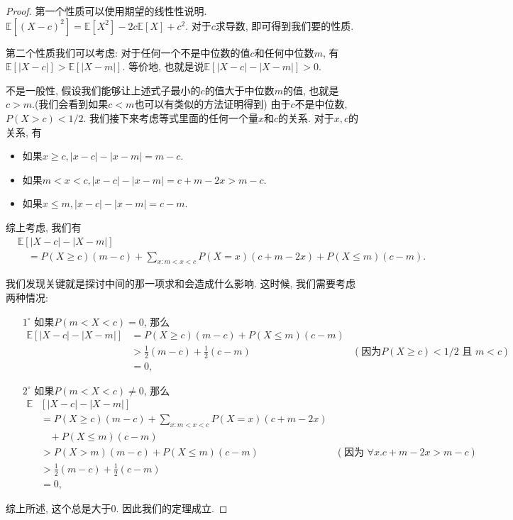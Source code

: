 \begin{proof}
    第一个性质可以使用期望的线性性说明. $\mathbb{E}\left[(X-c)^2\right]=\mathbb{E}\left[X^2\right]-2 c \mathbb{E}[X]+c^2$. 对于$c$求导数, 即可得到我们要的性质. 

    第二个性质我们可以考虑: 对于任何一个不是中位数的值$c$和任何中位数$m$, 有$\mathbb{E}[|X-c|]>\mathbb{E}[|X-m|]$. 等价地, 也就是说$\mathbb{E}[|X-c|-|X-m|]>0$. 

    不是一般性, 假设我们能够让上述式子最小的$c$的值大于中位数$m$的值, 也就是$c>m$.(我们会看到如果$c<m$也可以有类似的方法证明得到) 由于$c$不是中位数, $P(X>c)<1/2$. 我们接下来考虑等式里面的任何一个量$x$和$c$的关系. 对于$x,c$的关系, 有
    \begin{itemize}
        \item 如果$x \geq c,|x-c|-|x-m|=m-c$.
        \item 如果$m<x<c,|x-c|-|x-m|=c+m-2x>m-c$.
        \item 如果$x \leq m,|x-c|-|x-m|=c-m$.
    \end{itemize}

    综上考虑, 我们有
    $$\begin{aligned} & \mathbb{E}[|X-c|-|X-m|] \\ & \quad=P(X \geq c)(m-c)+\sum_{x: m<x<c} P(X=x)(c+m-2 x)+P(X \leq m)(c-m) .\end{aligned}$$

    我们发现关键就是探讨中间的那一项求和会造成什么影响. 这时候, 我们需要考虑两种情况:
    \begin{itemize}
        \item [$1^\circ$] 如果$P(m<X<c)=0$, 那么$$
        \begin{aligned}
        \mathbb{E}[|X-c|-|X-m|] & =P(X \geq c)(m-c)+P(X \leq m)(c-m) \\
        & >\frac{1}{2}(m-c)+\frac{1}{2}(c-m) &(\text{因为}P(X \geq c)<1 / 2 \text { 且 } m<c)\\
        & =0,
        \end{aligned}
        $$
        \item [$2^\circ$] 如果$P(m<X<c)\neq 0$, 那么
        $$\begin{aligned}
            \mathbb{E} & {[|X-c|-|X-m|] } \\
            & =P(X \geq c)(m-c)+\sum_{x: m<x<c} P(X=x)(c+m-2 x)\\
            &~~~~+P(X \leq m)(c-m) \\
            & >P(X>m)(m-c)+P(X \leq m)(c-m) &(\text{因为 }\forall x. c+m-2 x>m-c)\\
            & >\frac{1}{2}(m-c)+\frac{1}{2}(c-m) \\
            & =0,
            \end{aligned}$$
    \end{itemize}

    综上所述, 这个总是大于0. 因此我们的定理成立. 
\end{proof}

